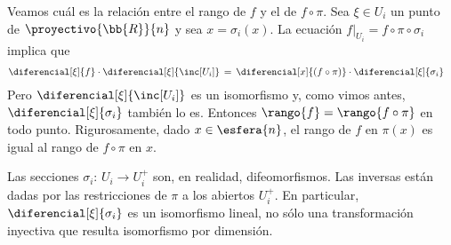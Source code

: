 \begin{ejemplo}
	Veamos cu\'{a}l es la relaci\'{o}n
	entre el rango de $f$ y el de $f\circ\pi$. Sea $\xi\in U_{i}$ un
	punto de $\proyectivo{\bb{R}}{n}$ y sea $x=\sigma_{i}(x)$. La
	ecuaci\'{o}n $f|_{U_{i}}=f\circ\pi\circ\sigma_{i}$ implica que
	\begin{align*}
		\diferencial[\xi]{f}\cdot\diferencial[\xi]{\inc[U_{i}]} &
		\,=\,
		\diferencial[x]{(f\circ\pi)}\cdot\diferencial[\xi]{\sigma_{i}}
	\end{align*}
	Pero $\diferencial[\xi]{\inc[U_{i}]}$ es un isomorfismo y,
	como vimos antes, $\diferencial[\xi]{\sigma_{i}}$ tambi\'{e}n lo es.
	Entonces $\rango{f}=\rango{f\circ\pi}$ en todo punto. Rigurosamente,
	dado $x\in\esfera{n}$, el rango de $f$ en $\pi(x)$ es igual al rango
	de $f\circ\pi$ en $x$.

	Las secciones $\sigma_{i}:\,U_{i}\rightarrow U_{i}^{+}$ son,
	en realidad, difeomorfismos. Las inversas est\'{a}n dadas por las
	restricciones de $\pi$ a los abiertos $U_{i}^{+}$. En particular,
	$\diferencial[\xi]{\sigma_{i}}$ es un isomorfismo lineal, no s\'{o}lo
	una transformaci\'{o}n inyectiva que resulta isomorfismo por
	dimensi\'{o}n.
\end{ejemplo}